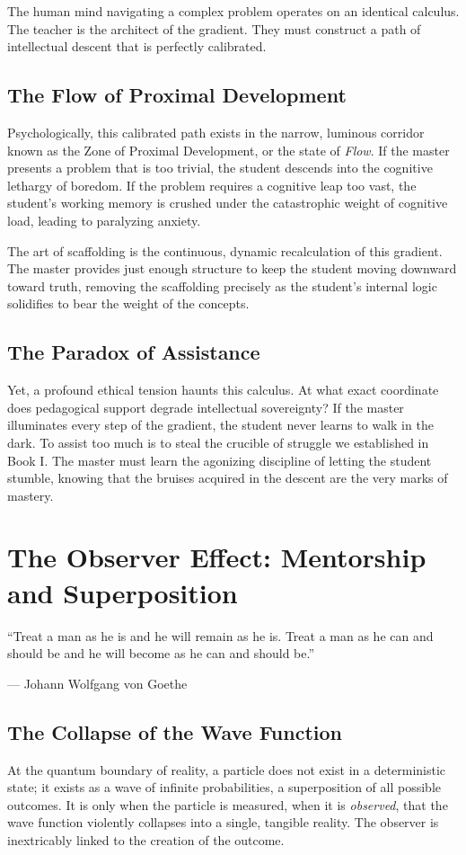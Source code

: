 \documentclass[11pt,a4paper,oneside]{book}
\theoremstyle{definition}
\theoremstyle{remark}
\begin{document}
The human mind navigating a complex problem operates on an identical calculus. The teacher is the architect of the gradient. They must construct a path of intellectual descent that is perfectly calibrated. 

\section{The Flow of Proximal Development}
Psychologically, this calibrated path exists in the narrow, luminous corridor known as the Zone of Proximal Development, or the state of \textit{Flow}. If the master presents a problem that is too trivial, the student descends into the cognitive lethargy of boredom. If the problem requires a cognitive leap too vast, the student’s working memory is crushed under the catastrophic weight of cognitive load, leading to paralyzing anxiety.

The art of scaffolding is the continuous, dynamic recalculation of this gradient. The master provides just enough structure to keep the student moving downward toward truth, removing the scaffolding precisely as the student's internal logic solidifies to bear the weight of the concepts.

\section{The Paradox of Assistance}
Yet, a profound ethical tension haunts this calculus. At what exact coordinate does pedagogical support degrade intellectual sovereignty? If the master illuminates every step of the gradient, the student never learns to walk in the dark. To assist too much is to steal the crucible of struggle we established in Book I. The master must learn the agonizing discipline of letting the student stumble, knowing that the bruises acquired in the descent are the very marks of mastery.

\chapter{The Observer Effect: Mentorship and Superposition}
\epigraph{``Treat a man as he is and he will remain as he is. Treat a man as he can and should be and he will become as he can and should be.''}{--- Johann Wolfgang von Goethe}

\section{The Collapse of the Wave Function}
At the quantum boundary of reality, a particle does not exist in a deterministic state; it exists as a wave of infinite probabilities, a superposition of all possible outcomes. It is only when the particle is measured, when it is \textit{observed}, that the wave function violently collapses into a single, tangible reality. The observer is inextricably linked to the creation of the outcome.
\end{document}
